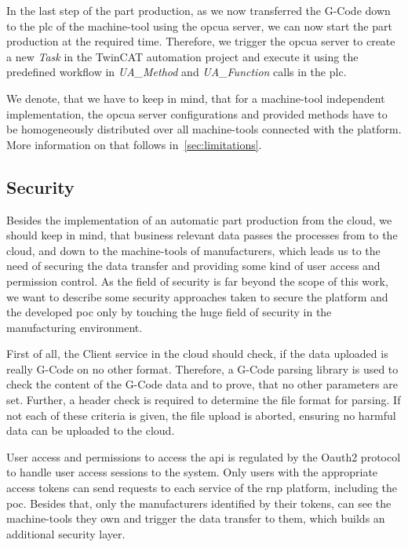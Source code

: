 \documentclass[
a4paper,
twoside,
headsepline,
cleardoublepage=empty,
parskip=half,
draft=false
]{scrbook}
\begin{document}
				In the last step of the part production, as we now transferred the G-Code down to the \gls{plc} of the machine-tool using the \gls{opcua} server, we can now start the part production at the required time. Therefore, we trigger the \gls{opcua} server to create a new \textit{Task} in the TwinCAT automation project and execute it using the predefined workflow in \textit{UA\_Method} and \textit{UA\_Function} calls in the \gls{plc}.

				We denote, that we have to keep in mind, that for a machine-tool independent implementation, the \gls{opcua} server configurations and provided methods have to be homogeneously distributed over all machine-tools connected with the platform. More information on that follows in~\cref{sec:limitations}.

			\subsection{Security} \label{subsec:security}

				Besides the implementation of an automatic part production from the cloud, we should keep in mind, that business relevant data passes the processes from to the cloud, and down to the machine-tools of manufacturers, which leads us to the need of securing the data transfer and providing some kind of user access and permission control. As the field of security is far beyond the scope of this work, we want to describe some security approaches taken to secure the platform and the developed \gls{poc} only by touching the huge field of security in the manufacturing environment.

				First of all, the Client service in the cloud should check, if the data uploaded is really G-Code on no other format. Therefore, a G-Code parsing library is used to check the content of the G-Code data and to prove, that no other parameters are set. Further, a header check is required to determine the file format for parsing. If not each of these criteria is given, the file upload is aborted, ensuring no harmful data can be uploaded to the cloud.

				User access and permissions to access the \gls{api} is regulated by the Oauth2 protocol to handle user access sessions to the system. Only users with the appropriate access tokens can send requests to each service of the \gls{rnp} platform, including the \gls{poc}. Besides that, only the manufacturers identified by their tokens, can see the machine-tools they own and trigger the data transfer to them, which builds an additional security layer.
\end{document}
